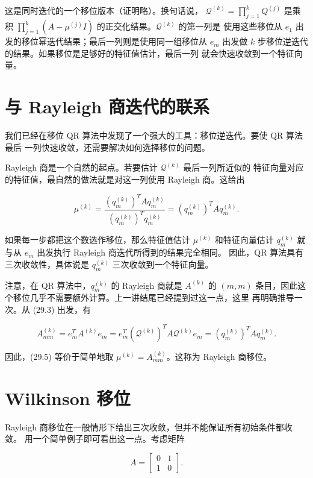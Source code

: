\documentclass[UTF8,fontset=none,12pt]{ctexart}
\begin{document}
这是同时迭代的一个移位版本（证明略）。换句话说，
$\mathcal Q^{(k)}=\prod_{j=1}^kQ^{(j)}$ 是乘积
$\prod_{j=1}^k(A-\mu^{(j)}I)$ 的正交化结果。$\mathcal Q^{(k)}$ 的第一列是
使用这些移位从 $e_1$ 出发的移位幂迭代结果；最后一列则是使用同一组移位从
$e_m$ 出发做 $k$ 步移位逆迭代的结果。如果移位是足够好的特征值估计，最后一列
就会快速收敛到一个特征向量。

\section*{与 Rayleigh 商迭代的联系}

我们已经在移位 QR 算法中发现了一个强大的工具：移位逆迭代。要使 QR 算法最后
一列快速收敛，还需要解决如何选择移位的问题。

Rayleigh 商是一个自然的起点。若要估计 $\mathcal Q^{(k)}$ 最后一列所近似的
特征向量对应的特征值，最自然的做法就是对这一列使用 Rayleigh 商。这给出

\begin{equation}
\mu^{(k)}
 =\frac{(q_m^{(k)})^TAq_m^{(k)}}{(q_m^{(k)})^Tq_m^{(k)}}
 =(q_m^{(k)})^TAq_m^{(k)}.
\tag{29.5}
\end{equation}

如果每一步都把这个数选作移位，那么特征值估计 $\mu^{(k)}$ 和特征向量估计
$q_m^{(k)}$ 就与从 $e_m$ 出发执行 Rayleigh 商迭代所得到的结果完全相同。
因此，QR 算法具有三次收敛性，具体说是 $q_m^{(k)}$ 三次收敛到一个特征向量。

注意，在 QR 算法中，$q_m^{(k)}$ 的 Rayleigh 商就是 $A^{(k)}$ 的 $(m,m)$
条目，因此这个移位几乎不需要额外计算。上一讲结尾已经提到过这一点，这里
再明确推导一次。从 (29.3) 出发，有

\begin{equation}
A_{mm}^{(k)}=e_m^TA^{(k)}e_m
 =e_m^T(\mathcal Q^{(k)})^TA\mathcal Q^{(k)}e_m
 =(q_m^{(k)})^TAq_m^{(k)}.
\tag{29.6}
\end{equation}

因此，(29.5) 等价于简单地取
$\mu^{(k)}=A_{mm}^{(k)}$。这称为 Rayleigh 商移位。

\section*{Wilkinson 移位}

Rayleigh 商移位在一般情形下给出三次收敛，但并不能保证所有初始条件都收敛。
用一个简单例子即可看出这一点。考虑矩阵

\begin{equation}
A=\begin{bmatrix}0&1\\1&0\end{bmatrix}.
\tag{29.7}
\end{equation}
\end{document}

